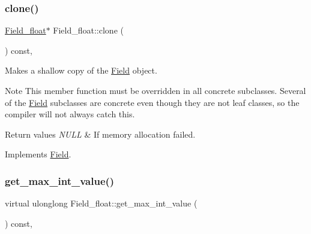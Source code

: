 \mbox{\label{classField__float_abcf510d42f59bcb302d155e97a48ce72}} 
\subsubsection{\texorpdfstring{clone()}{clone()}\hspace{0.1cm}{\footnotesize\ttfamily [2/2]}}
{\footnotesize\ttfamily \mbox{\hyperlink{classField__float}{Field\+\_\+float}}$\ast$ Field\+\_\+float\+::clone (\begin{DoxyParamCaption}{ }\end{DoxyParamCaption}) const\hspace{0.3cm}{\ttfamily [inline]}, {\ttfamily [virtual]}}

Makes a shallow copy of the \mbox{\hyperlink{classField}{Field}} object.

\begin{DoxyNote}{Note}
This member function must be overridden in all concrete subclasses. Several of the \mbox{\hyperlink{classField}{Field}} subclasses are concrete even though they are not leaf classes, so the compiler will not always catch this.
\end{DoxyNote}

\begin{DoxyRetVals}{Return values}
{\em N\+U\+LL} & If memory allocation failed. \\
\hline
\end{DoxyRetVals}


Implements \mbox{\hyperlink{classField_a01a9a9aa3a618941e839b1b8793c969d}{Field}}.

\mbox{\label{classField__float_ab810f7d0ea9d35b3fdef5829195921a0}} 
\subsubsection{\texorpdfstring{get\+\_\+max\+\_\+int\+\_\+value()}{get\_max\_int\_value()}}
{\footnotesize\ttfamily virtual ulonglong Field\+\_\+float\+::get\+\_\+max\+\_\+int\+\_\+value (\begin{DoxyParamCaption}{ }\end{DoxyParamCaption}) const\hspace{0.3cm}{\ttfamily [inline]}, {\ttfamily [virtual]}}

